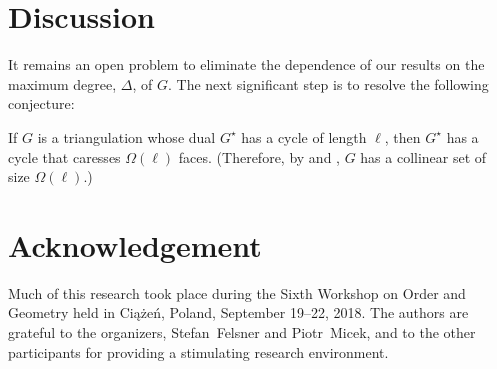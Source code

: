\documentclass{patmorin}
\newcommand{\dual}[1]{{#1}^\star}
\newcommand{\note}[2]{{\color{red}[#1:~#2]}}
\begin{document}
\section{Discussion}


It remains an open problem to eliminate the dependence of our results
on the maximum degree, $\Delta$, of $G$.  The next significant step
is to resolve the following conjecture:

\begin{conj}
  If $G$ is a triangulation whose dual $\dual{G}$ has a cycle of length
  $\ell$, then $\dual{G}$ has a cycle that caresses $\Omega(\ell)$
  faces. (Therefore, by  and ,
  $G$ has a collinear set of size $\Omega(\ell)$.)
\end{conj}


\section*{Acknowledgement}

Much of this research took place during the Sixth Workshop on Order and
Geometry held in Ciążeń, Poland, September 19--22, 2018.  The authors
are grateful to the organizers, Stefan~Felsner and Piotr~Micek, and to
the other participants for providing a stimulating research environment.




\end{document}
